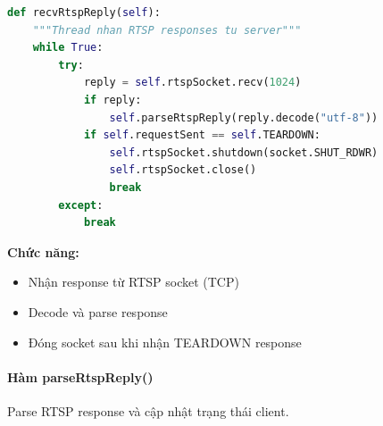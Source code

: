 \begin{lstlisting}[language=Python, caption={Receive RTSP Reply Thread}]
def recvRtspReply(self):
    """Thread nhan RTSP responses tu server"""
    while True:
        try:
            reply = self.rtspSocket.recv(1024)
            if reply:
                self.parseRtspReply(reply.decode("utf-8"))
            if self.requestSent == self.TEARDOWN:
                self.rtspSocket.shutdown(socket.SHUT_RDWR)
                self.rtspSocket.close()
                break
        except:
            break
\end{lstlisting}

\textbf{Chức năng:}
\begin{itemize}
    \item Nhận response từ RTSP socket (TCP)
    \item Decode và parse response
    \item Đóng socket sau khi nhận TEARDOWN response
\end{itemize}

\paragraph{Hàm parseRtspReply()}
Parse RTSP response và cập nhật trạng thái client.

